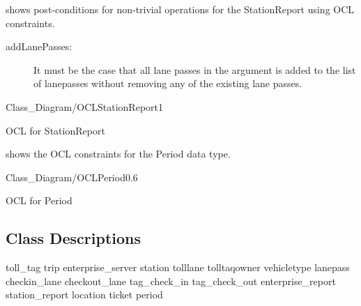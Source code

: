  shows post-conditions for non-trivial operations for the StationReport using OCL constraints.

\begin{description}
\item [addLanePasses:] It must be the case that all lane passes in the argument is added to the list of lanepasses without removing any of the existing lane passes.
\end{description}

\begin{myfigure}{Class_Diagram/OCLStationReport}{1}
\caption{OCL for StationReport\madeby{\mb}{\mt}}
\label{fig:OCLStationReport}
\end{myfigure}

 shows the OCL constraints for the Period data type.


\begin{myfigure}{Class_Diagram/OCLPeriod}{0.6}
\caption{OCL for Period \madeby{\kj}{\jb}}
\label{fig:OCLPeriod}
\end{myfigure}









\subsection{Class Descriptions}

{toll_tag}
{trip}
{enterprise_server}
{station}
{tolllane}
{tolltaqowner}
{vehicletype}
{lanepass}
{checkin_lane}
{checkout_lane}
{tag_check_in}
{tag_check_out}
{enterprise_report}
{station_report}
{location}
{ticket}
{period}
